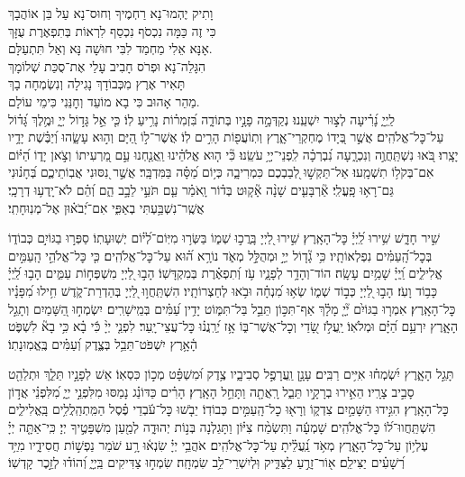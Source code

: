 \documentclass[twoside, openany, parskip=half, 11pt]{book}
\begin{document}
וָתִיק יֶהְמוּ־נָא רַחְמֶיךָ וְחוּס־נָא עַל בֵּן אוֹהֲבָךְ\\
כִּי זֶה כַּמָּה נִכְסֹף נִכְסַף לִרְאוֹת בְּתִפְאֶרֶת עֻזָּךְ\\
אָנָּא אֵלִי מַחְמַד לִבִּי חוּשָׁה נָּא וְאַל תִּתְעַלָּם.\\

הִגָּלֵה־נָא וּפְרֹס חָבִיב עָלַי אֶת־סֻכַּת שְׁלוֹמָךְ\\
תָּאִיר אֶרֶץ מִכְּבוֹדָךְ נָגִילָה וְנִשְׂמְחָה בָךְ\\
מַהֵר אָהוּב כִּי בָא מוֹעֵד וְחׇנֵּנִי כִּימֵי עוֹלָם.\\

לַֽיְיָ֑ נָ֝רִ֗יעָה לְצ֣וּר יִשְׁעֵֽנוּ׃
נְקַדְּמָ֣ה פָנָ֣יו בְּתוֹדָ֑ה בִּ֝זְמִר֗וֹת נָרִ֥יעַ לֽוֹ׃
כִּ֤י אֵ֣ל גָּד֣וֹל יְיָ֑ וּמֶ֥לֶךְ גָּ֝ד֗וֹל עַל־כׇּל־אֱלֹהִֽים׃
אֲשֶׁ֣ר בְּ֭יָדוֹ מֶחְקְרֵי־אָ֑רֶץ וְתֽוֹעֲפ֖וֹת הָרִ֣ים לֽוֹ׃
אֲשֶׁר־ל֣וֹ הַ֭יָּם וְה֣וּא עָשָׂ֑הוּ וְ֝יַבֶּ֗שֶׁת יָדָ֥יו יָצָֽרוּ׃
בֹּ֭אוּ נִשְׁתַּֽחֲוֶ֣ה וְנִכְרָ֑עָה נִ֝בְרְכָ֗ה לִֽפְנֵי־יְיָ֥ עֹשֵֽׂנוּ׃
כִּ֘י ה֤וּא אֱלֹהֵ֗ינוּ וַֽאֲנַ֤חְנוּ עַ֣ם מַ֭רְעִיתוֹ וְצֹ֣אן יָד֑וֹ הַ֝יּ֗וֹם אִם־בְּקֹל֥וֹ תִשְׁמָֽעוּ׃
אַל־תַּקְשׁ֣וּ לְ֭בַבְכֶם כִּמְרִיבָ֑ה כְּי֥וֹם מַ֝סָּ֗ה בַּמִּדְבָּֽר׃
אֲשֶׁ֣ר נִ֭סּוּנִי אֲבֽוֹתֵיכֶ֑ם בְּ֝חָנ֗וּנִי גַּם־רָא֥וּ פָֽעֳלִֽי׃
אַ֘רְבָּעִ֤ים שָׁנָ֨ה אָ֘ק֤וּט בְּד֗וֹר וָֽאֹמַ֗ר עַ֤ם תֹּעֵ֣י לֵבָ֣ב הֵ֑ם וְ֝הֵ֗ם לֹא־יָֽדְע֥וּ דְרָכָֽי׃
אֲשֶֽׁר־נִשְׁבַּ֥עְתִּי בְאַפִּ֑י אִם־יְ֝בֹא֗וּן אֶל־מְנֽוּחָתִֽי׃


שִׁ֣יר חָדָ֑שׁ שִׁ֥ירוּ לַֽ֝יְיָ֗ כׇּל־הָאָֽרֶץ׃
שִׁ֣ירוּ לַ֭יְיָ בָּֽרֲכ֣וּ שְׁמ֑וֹ בַּשְּׂר֥וּ מִיּֽוֹם־לְ֝י֗וֹם יְשֽׁוּעָתֽוֹ׃
סַפְּר֣וּ בַגּוֹיִ֣ם כְּבוֹד֑וֹ בְּכׇל־הָֽ֝עַמִּ֗ים נִפְלְאוֹתָֽיו׃
כִּ֥י גָ֘ד֤וֹל יְיָ֣ וּמְהֻלָּ֣ל מְאֹ֑ד נוֹרָ֥א ה֝֗וּא עַל־כׇּל־אֱלֹהִֽים׃
כִּ֤י כׇּל־אֱלֹהֵ֣י הָֽעַמִּ֣ים אֱלִילִ֑ים וַֽ֝יְיָ֗ שָׁמַ֥יִם עָשָֽׂה׃
הוֹד־וְהָדָ֥ר לְפָנָ֑יו עֹ֥ז וְ֝תִפְאֶ֗רֶת בְּמִקְדָּשֽׁוֹ׃
הָב֣וּ לַ֭יְיָ מִשְׁפְּח֣וֹת עַמִּ֑ים הָב֥וּ לַֽ֝יְיָ֗ כָּב֥וֹד וָעֹֽז׃
הָב֣וּ לַ֭יְיָ כְּב֣וֹד שְׁמ֑וֹ שְׂא֥וּ מִ֝נְחָ֗ה וּבֹ֥אוּ לְחַצְרוֹתָֽיו׃
הִשְׁתַּֽחֲו֣וּ לַ֭יְיָ בְּהַדְרַת־קֹ֑דֶשׁ חִ֥ילוּ מִ֝פָּנָ֗יו כׇּל־הָאָֽרֶץ׃
אִמְר֤וּ בַגּוֹיִ֨ם יְ֘יָ֤ מָלָ֗ךְ אַף־תִּכּ֣וֹן תֵּבֵ֣ל בַּל־תִּמּ֑וֹט יָדִ֥ין עַ֝מִּ֗ים בְּמֵֽישָׁרִֽים׃
יִשְׂמְח֣וּ הַ֭שָּׁמַיִם וְתָגֵ֣ל הָאָ֑רֶץ יִרְעַ֥ם הַ֝יָּ֗ם וּמְלֹאֽוֹ׃
יַֽעֲלֹ֣ז שָׂ֭דַי וְכׇל־אֲשֶׁר־בּ֑וֹ אָ֥ז יְ֝רַֽנֲנ֗וּ כׇּל־עֲצֵי־יָֽעַר׃
לִפְנֵ֤י יְיָ֨ כִּ֬י בָ֗א כִּ֥י בָא֘ לִשְׁפֹּ֢ט הָ֫אָ֥רֶץ יִשְׁפֹּט־תֵּבֵ֥ל בְּצֶ֑דֶק וְ֝עַמִּ֗ים בֶּֽאֱמֽוּנָתֽוֹ׃

תָּגֵ֣ל הָאָ֑רֶץ יִ֝שְׂמְח֗וּ אִיִּ֥ים רַבִּֽים׃
עָנָ֣ן וַֽעֲרָפֶ֣ל סְבִיבָ֑יו צֶ֥דֶק וּ֝מִשְׁפָּ֗ט מְכ֣וֹן כִּסְאֽוֹ׃
אֵשׁ לְפָנָ֣יו תֵּלֵ֑ךְ וּתְלַהֵ֖ט סָבִ֣יב צָרָֽיו׃
הֵאִ֣ירוּ בְרָקָ֣יו תֵּבֵ֑ל רָֽאֲתָ֖ה וַתָּחֵ֣ל הָאָֽרֶץ׃
הָרִ֗ים כַּדּוֹנַ֗ג נָמַסּוּ מִלִּפְנֵ֣י יְיָ֑ מִ֝לִּפְנֵ֗י אֲד֣וֹן כׇּל־הָאָֽרֶץ׃
הִגִּ֣ידוּ הַשָּׁמַ֣יִם צִדְק֑וֹ וְרָא֖וּ כׇל־הָֽעַמִּ֣ים כְּבוֹדֽוֹ׃
יֵבֹ֤שׁוּ כׇּל־עֹ֬בְדֵי פֶ֗סֶל הַמִּֽתְהַֽלֲלִ֥ים בָּֽאֱלִילִ֑ים הִשְׁתַּֽחֲווּ־ל֝וֹ כׇּל־אֱלֹהִֽים׃
שָׁמְעָ֬ה וַתִּשְׂמַ֨ח צִיּ֗וֹן וַתָּגֵלְנָה בְּנ֣וֹת יְהוּדָ֑ה לְמַ֖עַן מִשְׁפָּטֶ֣יךָ יְיָ׃
כִּֽי־אַתָּ֤ה יְיָ֗ עֶלְי֥וֹן עַל־כׇּל־הָאָ֑רֶץ מְאֹ֥ד נַֽ֝עֲלֵ֗יתָ עַל־כׇּל־אֱלֹהִֽים׃
אֹהֲבֵ֥י יְיָ֗ שִׂנְא֫וּ רָ֥ע שֹׁמֵר נַפְשׁ֣וֹת חֲסִידָ֑יו מִיַּ֥ד רְ֝שָׁעִ֗ים יַצִּילֵֽם׃
א֖וֹר־זָרֻ֣עַ לַצַּדִּ֑יק וּֽלְיִשְׁרֵי־לֵ֥ב שִׂמְחָֽה׃
שִׂמְח֣וּ צַדִּיקִים בַּֽיְיָ֑ וְ֝הוֹד֗וּ לְזֵ֣כֶר קָדְשֽׁוֹ׃
\end{document}
